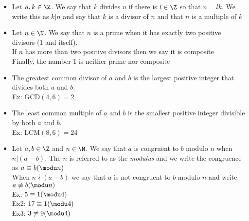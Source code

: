 \begin{itemize}
    \item Let $n,k\in\Z$. We say that $k$ divides $n$ if there is $l\in\Z$ so that $n=lk$. We write this as $k|n$ and say that $k$ is a divisor of $n$ and that $n$ is a multiple of $k$
    \item Let $n\in\N$. We say that $n$ is a prime when it has exactly two positive divisors ($1$ and itself).\\
    If $n$ has more than two positive divisors then we say it is composite\\
    Finally, the number 1 is neither prime nor composite
    \item The greatest common divisor of $a$ and $b$ is the largest positive integer that divides both $a$ and $b$.\\
    Ex: $\mathrm{GCD}(4,6)=2$
    \item The least common multiple of $a$ and $b$ is the smallest positive integer divisible by both $a$ and $b$.\\
    Ex: $\mathrm{LCM}(8,6)=24$
    \item Let $a,b\in\Z$ and $n\in\N$. We say that $a$ is congruent to $b$ modulo $n$ when $n|(a-b)$. The $n$ is referred to as the \textit{modulus} and we write the congruence as $a\equiv b(\modu n)$\\
    When $n\nmid (a-b)$ we say that $a$ is not congruent to $b$ modulo $n$ and write $a\not\equiv b(\modu n)$\\
    Ex: $5\equiv 1(\modu4)$\\
    Ex2: $17\equiv1(\modu4)$\\
    Ex3: $3\not\equiv9(\modu4)$
\end{itemize}

